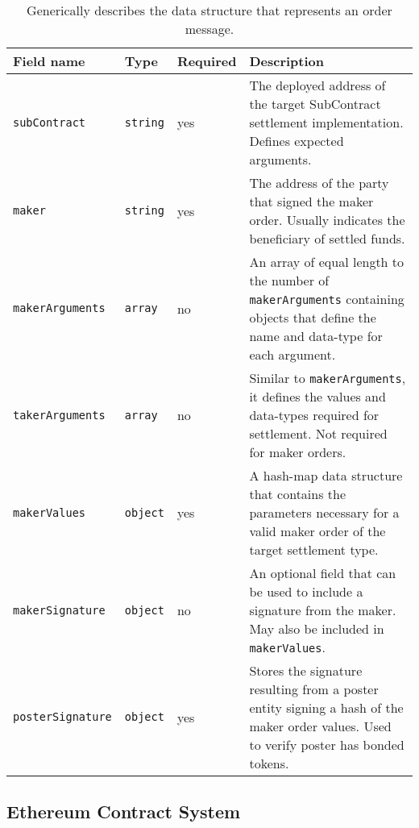 \documentclass[9pt]{article}
\begin{document}
\bgroup
\def\arraystretch{1.2}
\begin{table}[H]
\centering
\label{table:table2}
\begin{tabularx}{1\textwidth}{|l|l|l|X|}
\hline
\textbf{Field name} & \textbf{Type} & \textbf{Required} & \textbf{Description} \\
\hline
\texttt{subContract} & \texttt{string} & yes & The deployed address of the target SubContract settlement implementation. Defines expected arguments. \\
\hline
\texttt{maker} & \texttt{string} & yes & The address of the party that signed the maker order. Usually indicates the beneficiary of settled funds. \\
\hline
\texttt{makerArguments} & \texttt{array} & no & An array of equal length to the number of \texttt{makerArguments} containing objects that define the name and data-type for each argument. \\
\hline
\texttt{takerArguments} & \texttt{array} & no & Similar to \texttt{makerArguments}, it defines the values and data-types required for settlement. Not required for maker orders. \\
\hline
\texttt{makerValues} & \texttt{object} & yes & A hash-map data structure that contains the parameters necessary for a valid maker order of the target settlement type. \\
\hline
\texttt{makerSignature} & \texttt{object} & no & An optional field that can be used to include a signature from the maker. May also be included in \texttt{makerValues}. \\
\hline
\texttt{posterSignature} & \texttt{object} & yes & Stores the signature resulting from a poster entity signing a hash of the maker order values. Used to verify poster has bonded tokens. \\
\hline
\end{tabularx}
\caption{Generically describes the data structure that represents an order message.} 
\end{table}
\egroup

\subsection{Ethereum Contract System}\label{ethereum-contract-system}
\end{document}
